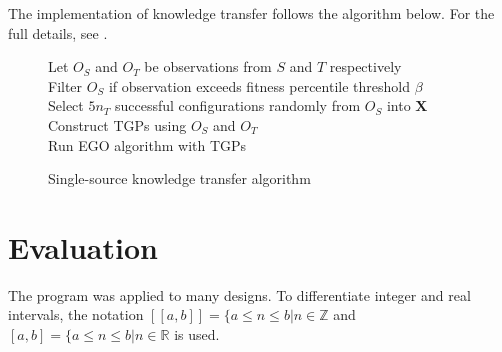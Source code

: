 \documentclass[10pt,a4paper]{article}
\newcommand{\dsb}[1]{[\![#1]\!]}
\begin{document}
The implementation of knowledge transfer follows the algorithm below. For the full details, see .
\begin{figure}[H]
	\begin{framed}
		\begin{algorithm}[H]
			Let $O_S$ and $O_T$ be observations from $S$ and $T$ respectively\\
			Filter $O_S$ if observation exceeds fitness percentile threshold $\beta$\\
			Select $5n_T$ successful configurations randomly from $O_S$ into $\mathbf{X}$\\
			Construct TGPs using $O_S$ and $O_T$\\
			Run EGO algorithm with TGPs
		\end{algorithm}		
	\end{framed}
	\caption{Single-source knowledge transfer algorithm}
\end{figure}

\section{Evaluation}

The program was applied to many designs. To differentiate integer and real intervals, the notation $\dsb{a,b}=\{a\le n\le b|n\in\mathbb{Z}$ and $[a,b]=\{a\le n\le b|n\in\mathbb{R}$ is used.
\end{document}
